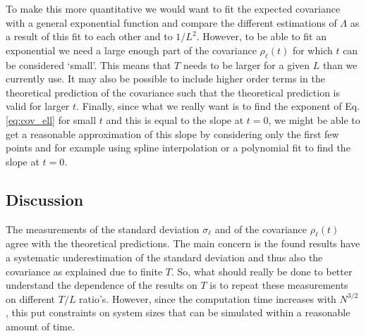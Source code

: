 To make this more quantitative we would want to fit the expected covariance with a general exponential function and compare the different estimations of $\Lambda$ as a result of this fit to each other and to $1/L^2$.
However, to be able to fit an exponential we need a large enough part of the covariance $\rho_\ell(t)$ for which $t$ can be considered `small'.
This means that $T$ needs to be larger for a given $L$ than we currently use.
It may also be possible to include higher order terms in the theoretical prediction of the covariance such that the theoretical prediction is valid for larger $t$.
Finally, since what we really want is to find the exponent of Eq. \eqref{eq:cov_ell} for small $t$ and this is equal to the slope at $t = 0$, we might be able to get a reasonable approximation of this slope by considering only the first few points and for example using spline interpolation or a polynomial fit to find the slope at $t=0$.

% 


\subsection{Discussion}\label{sec:discussion}
The measurements of the standard deviation $\sigma_\ell$ and of the covariance $\rho_\ell(t)$ agree with the theoretical predictions.
The main concern is the found results have a systematic underestimation of the standard deviation and thus also the covariance as explained due to finite $T$.
So, what should really be done to better understand the dependence of the results on $T$ is to repeat these measurements on different $T/L$ ratio's.
However, since the computation time increases with $N^{3/2}$, this put constraints on system sizes that can be simulated within a reasonable amount of time.

